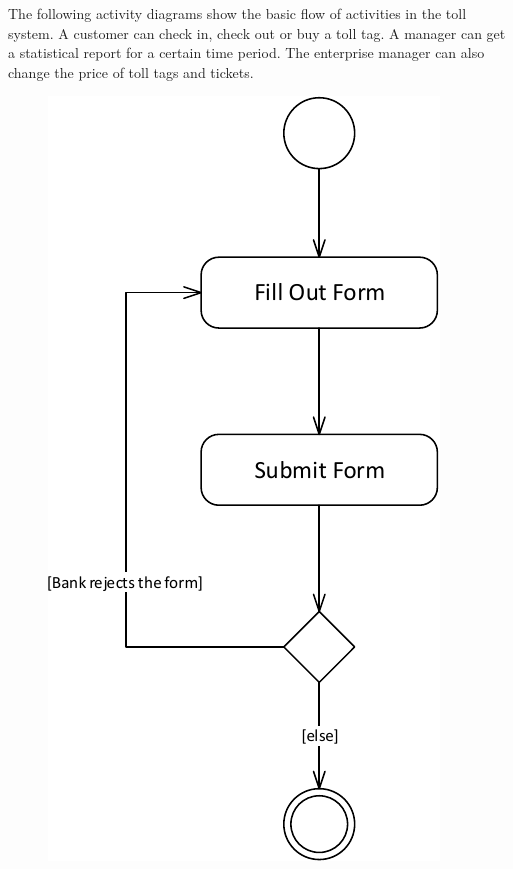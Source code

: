 The following activity diagrams show the basic flow of activities in the toll system. A customer can check in, check out or buy a toll tag. A manager can get a statistical report for a certain time period. The enterprise manager can also change the price of toll tags and tickets.

\begin{figure}[H]
	\centering
	\begin{minipage}{0.3\textwidth}
	\includegraphics[width=\textwidth]{img/activity_diagram/buy_toll_tag}

\end{minipage}
\end{figure}

